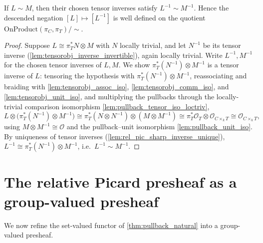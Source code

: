 \begin{lemma}\leanok
  \label{lem:relpic_rel_neg}
  If \(L \sim M\), then their chosen tensor inverses satisfy \(L^{-1} \sim
  M^{-1}\). Hence the descended negation \([L] \mapsto [L^{-1}]\) is well defined
  on the quotient \(\mathrm{OnProduct}(\pi_C, \pi_T) / {\sim}\).
\end{lemma}

\begin{proof}
  \leanok
  Suppose \(L \cong \pi_T^* N \otimes M\) with \(N\) locally trivial, and let
  \(N^{-1}\) be its tensor inverse (\cref{lem:tensorobj_inverse_invertible}),
  again locally trivial. Write \(L^{-1}, M^{-1}\) for the chosen tensor inverses
  of \(L, M\). We show \(\pi_T^*(N^{-1}) \otimes M^{-1}\) is a tensor inverse of
  \(L\): tensoring the hypothesis with \(\pi_T^*(N^{-1}) \otimes M^{-1}\),
  reassociating and braiding with
  \cref{lem:tensorobj_assoc_iso}, \cref{lem:tensorobj_comm_iso}, and
  \cref{lem:tensorobj_unit_iso},
  and multiplying the pullbacks through the locally-trivial comparison
  isomorphism \cref{lem:pullback_tensor_iso_loctriv},
  \[
    L \otimes \bigl(\pi_T^*(N^{-1}) \otimes M^{-1}\bigr)
      \cong \pi_T^*(N \otimes N^{-1}) \otimes (M \otimes M^{-1})
      \cong \pi_T^* \mathcal{O}_T \otimes \mathcal{O}_{C \times_k T}
      \cong \mathcal{O}_{C \times_k T} ,
  \]
  using \(M \otimes M^{-1} \cong \mathcal{O}\) and the pullback--unit
  isomorphism \cref{lem:pullback_unit_iso}. By uniqueness of tensor inverses
  (\cref{lem:rel_pic_sharp_inverse_unique}),
  \(L^{-1} \cong \pi_T^*(N^{-1}) \otimes M^{-1}\), i.e.\ \(L^{-1} \sim M^{-1}\).
\end{proof}

\section{The relative Picard presheaf as a group-valued presheaf}
\label{sec:relpic_groupvalued}

We now refine the set-valued functor of \cref{thm:pullback_natural} into a
group-valued presheaf.

